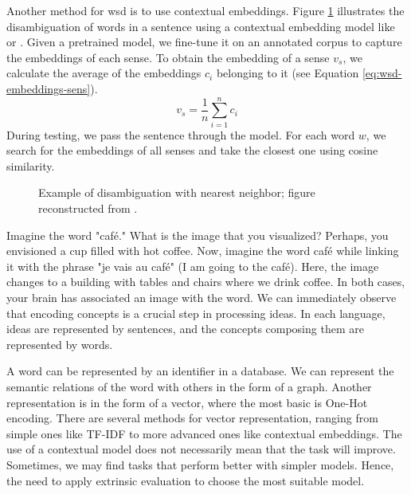\documentclass{KBook}
\begin{document}
Another method for \ac{wsd} is to use contextual embeddings. Figure \ref{fig:swd-embeddings} illustrates the disambiguation of words in a sentence using a contextual embedding model like  or . Given a pretrained model, we fine-tune it on an annotated corpus to capture the embeddings of each sense. To obtain the embedding of a sense $v_s$, we calculate the average of the embeddings $c_i$ belonging to it (see Equation \ref{eq:wsd-embeddings-sens}).
\begin{equation}
	v_s = \frac{1}{n} \sum_{i=1}^{n} c_i 
	\label{eq:wsd-embeddings-sens}
\end{equation}
During testing, we pass the sentence through the model. For each word $w$, we search for the embeddings of all senses and take the closest one using cosine similarity.

\begin{figure}[ht]
	\centering
	\caption[Example of disambiguation with nearest neighbor.]{Example of disambiguation with nearest neighbor; figure reconstructed from \cite{2019-jurafsky-martin}.}
	\label{fig:swd-embeddings}
\end{figure}



Imagine the word "café."
What is the image that you visualized?
Perhaps, you envisioned a cup filled with hot coffee.
Now, imagine the word café while linking it with the phrase "je vais au café" (I am going to the café).
Here, the image changes to a building with tables and chairs where we drink coffee.
In both cases, your brain has associated an image with the word.
We can immediately observe that encoding concepts is a crucial step in processing ideas.
In each language, ideas are represented by sentences, and the concepts composing them are represented by words.

A word can be represented by an identifier in a database.
We can represent the semantic relations of the word with others in the form of a graph.
Another representation is in the form of a vector, where the most basic is One-Hot encoding.
There are several methods for vector representation, ranging from simple ones like TF-IDF to more advanced ones like contextual embeddings.
The use of a contextual model does not necessarily mean that the task will improve.
Sometimes, we may find tasks that perform better with simpler models.
Hence, the need to apply extrinsic evaluation to choose the most suitable model.
\end{document}
